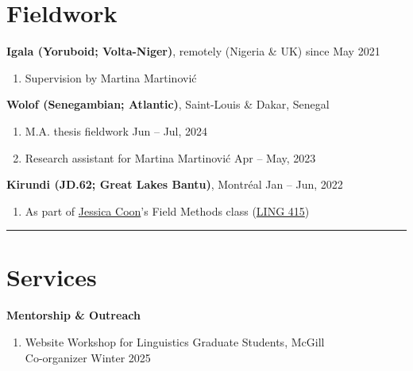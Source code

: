 \documentclass[margin,line]{resume}
\begin{document}
\begin{resume}
		\section{\mysidestyle Fieldwork}

		\textbf{Igala (Yoruboid; Volta-Niger)}, remotely (Nigeria \& UK) \hfill since May 2021
		\begin{enumerate}[-, leftmargin=1em, topsep=2pt]
			\item[] Supervision by Martina Martinović
		\end{enumerate}
	
	
		\textbf{Wolof (Senegambian; Atlantic)}, Saint-Louis \& Dakar, Senegal %
		\begin{enumerate}[-, leftmargin=1em, topsep=2pt]
			\item[] M.A. thesis fieldwork \hfill Jun -- Jul, 2024
			\item[] Research assistant for Martina Martinović \hfill Apr -- May, 2023
		\end{enumerate}
	
		\textbf{Kirundi (JD.62; Great Lakes Bantu)}, Montr\'{e}al \hfill Jan -- Jun, 2022
		\begin{enumerate}[-, leftmargin=1em, topsep=2pt]
			\item[] As part of \href{https://jessica.lingspace.org/}{Jessica Coon}'s Field Methods class (\href{https://www.mcgill.ca/study/2021-2022/courses/ling-415}{LING 415})
		\end{enumerate}
	
		\vspace{-0.9em}\rule{\textwidth}{0.4pt}


	\vspace{-0.5em}

	\section{\mysidestyle Services}


	\textbf{Mentorship \& Outreach}
	\begin{enumerate}[-, leftmargin=1em, topsep=2pt]
		\item[] Website Workshop for Linguistics Graduate Students, McGill\\
		\hphantom{...}Co-organizer \hfill Winter 2025


\end{enumerate}
\end{resume}
\end{document}

